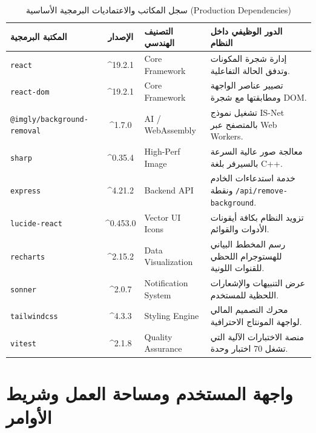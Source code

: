 \documentclass[12pt,a4paper]{report}
\begin{document}
\begin{table}[htbp]
    \centering
    \caption{سجل المكاتب والاعتماديات البرمجية الأساسية (Production Dependencies)}
    \label{tab:dependencies}
    \begin{tabularx}{\textwidth}{l c l X}
        \toprule
        \textbf{المكتبة البرمجية} & \textbf{الإصدار} & \textbf{التصنيف الهندسي} & \textbf{الدور الوظيفي داخل النظام} \\
        \midrule
        \texttt{react} & \textasciicircum 19.2.1 & Core Framework & إدارة شجرة المكونات وتدفق الحالة التفاعلية. \\
        \texttt{react-dom} & \textasciicircum 19.2.1 & Core Framework & تصيير عناصر الواجهة ومطابقتها مع شجرة DOM. \\
        \texttt{@imgly/background-removal} & \textasciicircum 1.7.0 & AI / WebAssembly & تشغيل نموذج IS-Net بالمتصفح عبر Web Workers. \\
        \texttt{sharp} & \textasciicircum 0.35.4 & High-Perf Image & معالجة صور عالية السرعة بالسيرفر بلغة C++. \\
        \texttt{express} & \textasciicircum 4.21.2 & Backend API & خدمة استدعاءات الخادم ونقطة \texttt{/api/remove-background}. \\
        \texttt{lucide-react} & \textasciicircum 0.453.0 & Vector UI Icons & تزويد النظام بكافة أيقونات الأدوات والقوائم. \\
        \texttt{recharts} & \textasciicircum 2.15.2 & Data Visualization & رسم المخطط البياني للهستوجرام اللحظي للقنوات اللونية. \\
        \texttt{sonner} & \textasciicircum 2.0.7 & Notification System & عرض التنبيهات والإشعارات اللحظية للمستخدم. \\
        \texttt{tailwindcss} & \textasciicircum 4.3.3 & Styling Engine & محرك التصميم المالي لواجهة المونتاج الاحترافية. \\
        \texttt{vitest} & \textasciicircum 2.1.8 & Quality Assurance & منصة الاختبارات الآلية التي تشغل 70 اختبار وحدة. \\
        \bottomrule
    \end{tabularx}
\end{table}

\chapter{واجهة المستخدم ومساحة العمل وشريط الأوامر}
\end{document}
